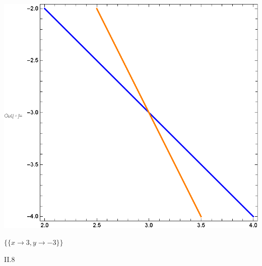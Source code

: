 \documentclass{article}
\begin{document}
\includegraphics{HWork02_linear_eqs_gr1.eps}

\begin{doublespace}
\noindent\(\{\{x\to 3,y\to -3\}\}\)
\end{doublespace}

II.8
\end{document}
